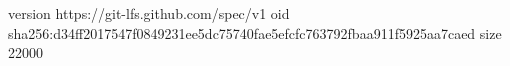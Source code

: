 version https://git-lfs.github.com/spec/v1
oid sha256:d34ff2017547f0849231ee5dc75740fae5efcfc763792fbaa911f5925aa7caed
size 22000

